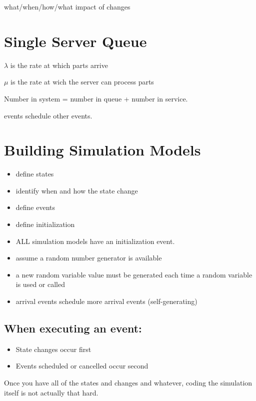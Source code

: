 \documentclass[fleqn]{report}
\begin{document}
what/when/how/what impact of changes 

\section{Single Server Queue}
$\lambda$ is the rate at which parts arrive 

$\mu$ is the rate at wich the server can process parts 

Number in system = number in queue + number in service. 

events schedule other events.

\section{Building Simulation Models}
\begin{itemize}
    \item 
    define states 
    \item 
    identify when and how the state change 
    \item 
    define events 
    \item 
    define initialization 
\end{itemize}

\begin{itemize}
    \item
    ALL simulation models have an initialization event. 
    \item
    assume a random number generator is available 
    \item
    a new random variable value must be generated each time a 
    random variable is used or called 
    \item
    arrival events schedule more arrival events (self-generating)
\end{itemize}

\subsection{When executing an event:}

\begin{itemize}
    \item
    State changes occur first 
    \item
    Events scheduled or cancelled occur second 
\end{itemize}

Once you have all of the states and changes and whatever, coding 
the simulation itself is not actually that hard. 
    
\end{document}
